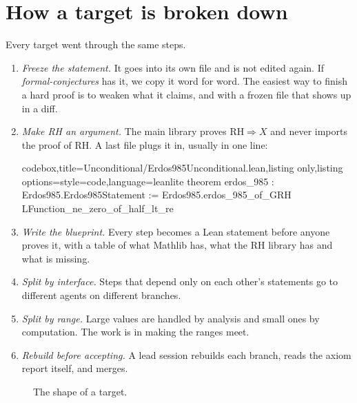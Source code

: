 \documentclass[11pt]{amsart}
\begin{document}
\section{How a target is broken down}\label{sec:break}

Every target went through the same steps.
\begin{enumerate}
\item \emph{Freeze the statement.} It goes into its own file and is not edited again. If \emph{formal-conjectures} has it, we copy it word for word. The easiest way to finish a hard proof is to weaken what it claims, and with a frozen file that shows up in a diff.
\item \emph{Make RH an argument.} The main library proves $\mathrm{RH}\Rightarrow X$ and never imports the proof of RH. A last file plugs it in, usually in one line:
\begin{tcblisting}{codebox,title=Unconditional/Erdos985Unconditional.lean,listing only,listing options={style=code,language=leanlite}}
theorem erdos_985 : Erdos985.Erdos985Statement :=
  Erdos985.erdos_985_of_GRH LFunction_ne_zero_of_half_lt_re
\end{tcblisting}
\item \emph{Write the blueprint.} Every step becomes a Lean statement before anyone proves it, with a table of what Mathlib has, what the RH library has and what is missing.
\item \emph{Split by interface.} Steps that depend only on each other's statements go to different agents on different branches.
\item \emph{Split by range.} Large values are handled by analysis and small ones by computation. The work is in making the ranges meet.
\item \emph{Rebuild before accepting.} A lead session rebuilds each branch, reads the axiom report itself, and merges.
\end{enumerate}

\begin{figure}[ht]
\centering
{}
\caption{The shape of a target.}\label{fig:shape}
\end{figure}
\end{document}
